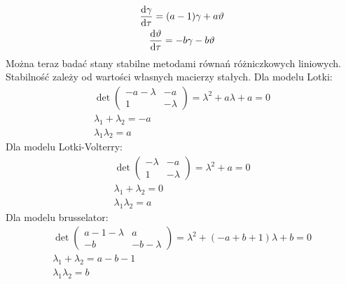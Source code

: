 \documentclass[10pt, a4paper, twoside, onecolumn]{article}
\numberwithin{equation}{section}
\begin{document}
	\begin{gather}
		\dv{\gamma}{\tau}=(a-1)\gamma+a\vartheta \\
		\dv{\vartheta}{\tau}=-b\gamma-b\vartheta
	\end{gather}
	Można teraz badać stany stabilne metodami równań różniczkowych liniowych. Stabilność zależy od wartości własnych macierzy stałych. Dla modelu Lotki:
	\begin{gather}
		\det
		\begin{pmatrix}
			-a-\lambda & -a \\
			1 & -\lambda
		\end{pmatrix}
		=\lambda^{2}+a\lambda+a=0 \\
		\lambda_{1}+\lambda_{2}=-a \\
		\lambda_{1}\lambda_{2}=a
	\end{gather}
	Dla modelu Lotki-Volterry:
	\begin{gather}
		\det
		\begin{pmatrix}
			-\lambda & -a \\
			1 & -\lambda
		\end{pmatrix}
		=\lambda^{2}+a=0 \\
		\lambda_{1}+\lambda_{2}=0 \\
		\lambda_{1}\lambda_{2}=a
	\end{gather}
	Dla modelu brusselator:
	\begin{gather}
		\det
		\begin{pmatrix}
			a-1-\lambda & a \\
			-b & -b-\lambda
		\end{pmatrix}
		=\lambda^{2}+(-a+b+1)\lambda+b=0 \\
		\lambda_{1}+\lambda_{2}=a-b-1 \\
		\lambda_{1}\lambda_{2}=b
	\end{gather}
\end{document}
